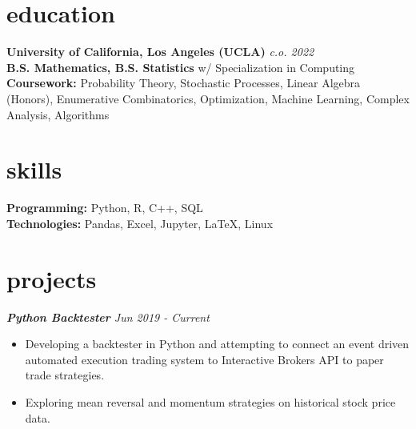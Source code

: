 \documentclass[margin, 12pt]{res} %
\begin{document}
\begin{resume}


\section{\large education}

{\bf University of California, Los Angeles (UCLA)} \hfill{\sl c.o. 2022}\\
{\sl}{\bf  B.S. Mathematics, B.S. Statistics}{ w/ Specialization in Computing}\\
{\bf Coursework:} Probability Theory, Stochastic Processes, Linear Algebra (Honors), Enumerative Combinatorics, Optimization, Machine Learning, Complex Analysis, Algorithms


\section{\large skills} 

{\bf Programming:} 
Python, R, C++, SQL\\ 
{\bf Technologies:}
Pandas, Excel,  Jupyter, {\LaTeX}, Linux
 
\section{\large projects} 


{\sl {\bf Python Backtester} \hfill Jun 2019 - Current} 
\begin{itemize}  \itemsep -1pt
\item Developing a backtester in Python and attempting to connect an event driven automated execution trading system to Interactive Brokers API to paper trade strategies.
\item Exploring mean reversal and momentum strategies on historical stock price data.
\end{itemize} 


\end{resume}
\end{document}
